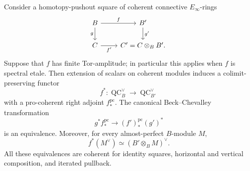 \begin{lemma}
\label{lem:bnla-procoherent-finite-tor-bc}
Consider a homotopy-pushout square of coherent connective $E_\infty$-rings
\[
\begin{tikzcd}
B \arrow[r,"f"] \arrow[d,"g"'] &
B' \arrow[d,"g'"]\\
C \arrow[r,"f'"'] &
C'=C\otimes_BB'.
\end{tikzcd}
\]
Suppose that $f$ has finite Tor-amplitude; in particular this applies when
$f$ is spectral etale.  Then extension of scalars on coherent modules induces
a colimit-preserving functor
\[
    f^*:\operatorname{QC}^{\vee}_B
    \longrightarrow
    \operatorname{QC}^{\vee}_{B'}
\]
with a pro-coherent right adjoint $f_*^{\mathrm{pc}}$.  The canonical
Beck--Chevalley transformation
\[
\boxed{
    g^*f_*^{\mathrm{pc}}
    \longrightarrow
    (f')_*^{\mathrm{pc}}(g')^*
}
\]
is an equivalence.  Moreover, for every almost-perfect $B$-module $M$,
\[
\boxed{
    f^*(M^\vee)
    \simeq
    (B'\otimes_BM)^\vee.}
\]
All these equivalences are coherent for identity squares, horizontal and
vertical composition, and iterated pullback.
\end{lemma}

